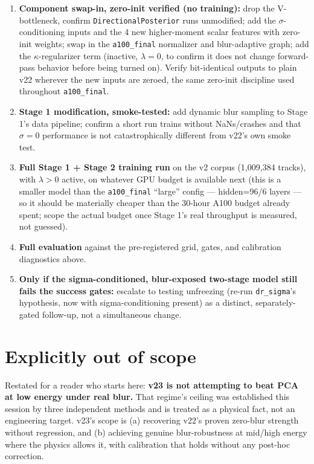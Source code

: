 \documentclass[11pt]{article}
\newcommand{\code}[1]{\texttt{#1}}
\begin{document}
\begin{enumerate}[leftmargin=*]
\item \textbf{Component swap-in, zero-init verified (no training):} drop the V-bottleneck,
      confirm \code{DirectionalPosterior} runs unmodified; add the $\sigma$-conditioning
      inputs and the 4 new higher-moment scalar features with zero-init weights; swap in the
      \code{a100\_final} normalizer and blur-adaptive graph; add the $\kappa$-regularizer
      term (inactive, $\lambda=0$, to confirm it does not change forward-pass behavior before
      being turned on). Verify bit-identical outputs to plain v22 wherever the new inputs are
      zeroed, the same zero-init discipline used throughout \code{a100\_final}.
\item \textbf{Stage 1 modification, smoke-tested:} add dynamic blur sampling to Stage 1's
      data pipeline; confirm a short run trains without NaNs/crashes and that $\sigma{=}0$
      performance is not catastrophically different from v22's own smoke test.
\item \textbf{Full Stage 1 + Stage 2 training run} on the v2 corpus (1{,}009{,}384 tracks),
      with $\lambda>0$ active, on whatever GPU budget is available next (this is a smaller
      model than the \code{a100\_final} ``large'' config --- hidden=96/6 layers --- so it
      should be materially cheaper than the 30-hour A100 budget already spent; scope the
      actual budget once Stage 1's real throughput is measured, not guessed).
\item \textbf{Full evaluation} against the pre-registered grid, gates, and calibration
      diagnostics above.
\item \textbf{Only if the sigma-conditioned, blur-exposed two-stage model still fails the
      success gates:} escalate to testing unfreezing (re-run \code{dr\_sigma}'s hypothesis,
      now with sigma-conditioning present) as a distinct, separately-gated follow-up, not a
      simultaneous change.
\end{enumerate}

\section{Explicitly out of scope}
Restated for a reader who starts here: \textbf{v23 is not attempting to beat PCA at low
energy under real blur.} That regime's ceiling was established this session by three
independent methods and is treated as a physical fact, not an engineering target. v23's
scope is (a) recovering v22's proven zero-blur strength without regression, and (b)
achieving genuine blur-robustness at mid/high energy where the physics allows it, with
calibration that holds without any post-hoc correction.
\end{document}
